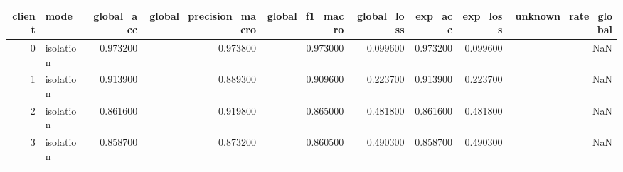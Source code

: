 \begin{tabular}{rlrrrrrrr}
\toprule
client & mode & global_acc & global_precision_macro & global_f1_macro & global_loss & exp_acc & exp_loss & unknown_rate_global \\
\midrule
0 & isolation & 0.973200 & 0.973800 & 0.973000 & 0.099600 & 0.973200 & 0.099600 & NaN \\
1 & isolation & 0.913900 & 0.889300 & 0.909600 & 0.223700 & 0.913900 & 0.223700 & NaN \\
2 & isolation & 0.861600 & 0.919800 & 0.865000 & 0.481800 & 0.861600 & 0.481800 & NaN \\
3 & isolation & 0.858700 & 0.873200 & 0.860500 & 0.490300 & 0.858700 & 0.490300 & NaN \\
\bottomrule
\end{tabular}
